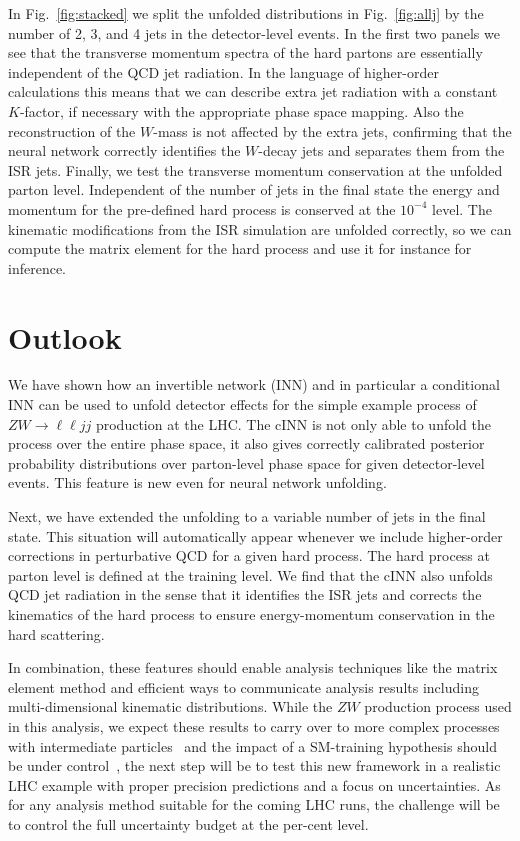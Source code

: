 In Fig.~\ref{fig:stacked} we split the unfolded distributions in
Fig.~\ref{fig:allj} by the number of 2, 3, and 4 jets in the
detector-level events. In the first two panels we see that the
transverse momentum spectra of the hard partons are essentially
independent of the QCD jet radiation. In the language of higher-order
calculations this means that we can describe extra jet radiation with
a constant $K$-factor, if necessary with the appropriate phase space
mapping. Also the reconstruction of the $W$-mass is not affected by
the extra jets, confirming that the neural network correctly
identifies the $W$-decay jets and separates them from the ISR
jets. Finally, we test the transverse momentum conservation at the
unfolded parton level. Independent of the number of jets in the final
state the energy and momentum for the pre-defined hard process is
conserved at the $10^{-4}$ level. The kinematic modifications from the
ISR simulation are unfolded correctly, so we can compute the matrix
element for the hard process and use it for instance for inference.\medskip

\section{Outlook}

We have shown how an invertible network (INN) and in particular a
conditional INN can be used to unfold detector effects for the simple
example process of $ZW \to \ell \ell jj$ production at the LHC. The
cINN is not only able to unfold the process over the entire phase
space, it also gives correctly calibrated posterior probability
distributions over parton-level phase space for given detector-level
events. This feature is new even for neural network unfolding.

Next, we have extended the unfolding to a variable number of jets in
the final state. This situation will automatically appear whenever we
include higher-order corrections in perturbative QCD for a given hard
process. The hard process at parton level is defined at the training
level. We find that the cINN also unfolds QCD jet radiation in the
sense that it identifies the ISR jets and corrects the kinematics of
the hard process to ensure energy-momentum conservation in the hard
scattering.

In combination, these features should enable analysis techniques like
the matrix element method and efficient ways to communicate analysis
results including multi-dimensional kinematic distributions. While the
$ZW$ production process used in this analysis, we expect these results
to carry over to more complex processes with intermediate
particles~\cite{gan_phasespace} and the impact of a SM-training
hypothesis should be under control~\cite{fcgan}, the next step will be
to test this new framework in a realistic LHC example with proper
precision predictions and a focus on uncertainties. As for any
analysis method suitable for the coming LHC runs, the challenge will
be to control the full uncertainty budget at the per-cent
level.

%
